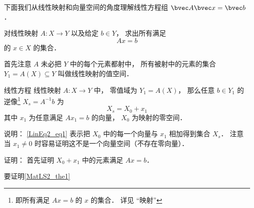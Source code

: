 

下面我们从线性映射和向量空间的角度理解线性方程组 $\bvec A \bvec x = \bvec b$．

对线性映射 $A:X\to Y$ 以及给定 $b \in Y$， 求出所有满足
\begin{equation}
Ax = b
\end{equation}
的 $x \in X$ 的集合．

首先注意 $A$ 未必把 $Y$ 中的每个元素都射中， 所有被射中的元素的集合 $Y_1 = A(X) \subseteq Y$ 叫做线性映射的值空间．

\begin{theorem}{线性方程}
线性映射 $A:X\to Y$ 中， 零值域为 $Y_1 = A(X)$， 那么任意 $b \in Y_1$ 的逆像\footnote{即所有满足 $Ax = b$ 的 $x$ 的集合． 详见 “映射”} $X_s = A^{-1}b$ 为
\begin{equation}\label{LinEq2_eq1}
X_s = X_0 + x_1
\end{equation}
其中 $x_1$ 为任意满足 $Ax_1 = b$ 的向量，  $X_0$ 为映射的零空间．
\end{theorem}
说明： \autoref{LinEq2_eq1} 表示把 $X_0$ 中的每一个向量与 $x_1$ 相加得到集合 $X_s$． 注意当 $x_1 \ne 0$ 时容易证明这不是一个向量空间（不存在零向量）．

证明： 首先证明 $X_0 + x_1$ 中的元素满足 $Ax = b$．

要证明\autoref{MatLS2_the1}~
